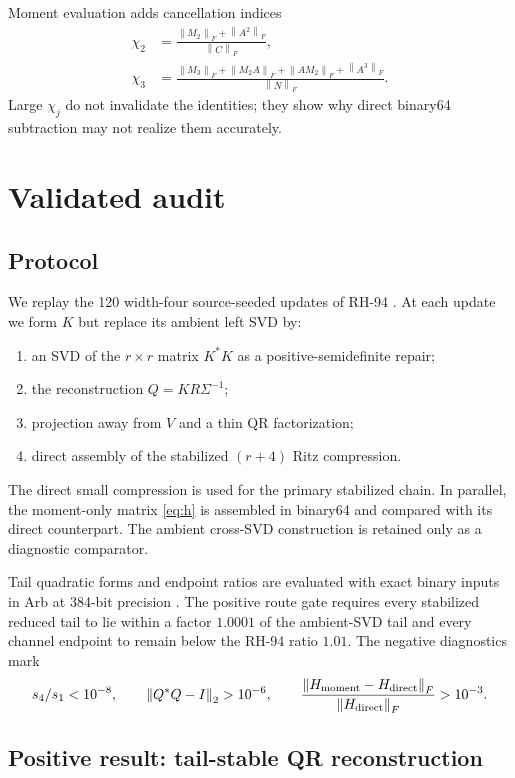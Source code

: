 \documentclass[11pt]{article}
\theoremstyle{definition}
\theoremstyle{remark}
\newcommand{\norm}[1]{\left\lVert#1\right\rVert}
\begin{document}
Moment evaluation adds cancellation indices
\begin{align}
 \chi_2&=\frac{\norm{M_2}_F+\norm{A^2}_F}{\norm C_F},\\
 \chi_3&=\frac{\norm{M_3}_F+\norm{M_2A}_F+\norm{AM_2}_F+\norm{A^3}_F}
 {\norm N_F}.
\end{align}
Large $\chi_j$ do not invalidate the identities; they show why direct
binary64 subtraction may not realize them accurately.

\section{Validated audit}
\label{sec:audit}

\subsection{Protocol}

We replay the 120 width-four source-seeded updates of RH-94
\citep{WangSourceSeed2026}.  At each update we form $K$ but replace its
ambient left SVD by:
\begin{enumerate}[leftmargin=2em]
\item an SVD of the $r\times r$ matrix $K^*K$ as a positive-semidefinite
repair;
\item the reconstruction $Q=KR\Sigma^{-1}$;
\item projection away from $V$ and a thin QR factorization;
\item direct assembly of the stabilized $(r+4)$ Ritz compression.
\end{enumerate}
The direct small compression is used for the primary stabilized chain.  In
parallel, the moment-only matrix \eqref{eq:h} is assembled in binary64 and
compared with its direct counterpart.  The ambient cross-SVD construction is
retained only as a diagnostic comparator.

Tail quadratic forms and endpoint ratios are evaluated with exact binary
inputs in Arb at 384-bit precision \citep{Rump2010}.  The positive route gate
requires every stabilized reduced tail to lie within a factor $1.0001$ of the
ambient-SVD tail and every channel endpoint to remain below the RH-94 ratio
$1.01$.  The negative diagnostics mark
\[
 s_4/s_1<10^{-8},\qquad
 \norm{Q^*Q-I}_2>10^{-6},\qquad
 \frac{\norm{H_{\rm moment}-H_{\rm direct}}_F}
 {\norm{H_{\rm direct}}_F}>10^{-3}.
\]

\subsection{Positive result: tail-stable QR reconstruction}
\end{document}
